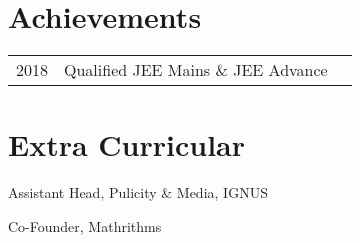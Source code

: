 \documentclass[]{deedy-resume-openfont}
\begin{document}
\begin{minipage}[t]{0.66\textwidth}

\section{Achievements} 
\begin{tabular}{rll}
2018	     & Qualified JEE Mains \& JEE Advance\\
\end{tabular}
\sectionsep

%     

\section{Extra Curricular} 
\vspace{\topsep} %
\begin{tightemize} 
\item Assistant Head, Pulicity \& Media, IGNUS
\item Co-Founder, Mathrithms
\end{tightemize}
\sectionsep


\end{minipage} 
\end{document}
